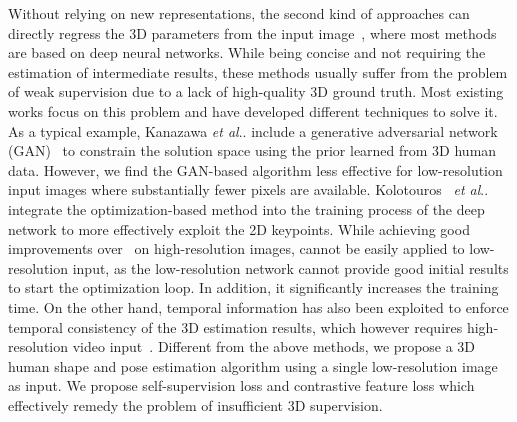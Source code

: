 \documentclass[runningheads]{llncs}
\makeatletter
\DeclareRobustCommand\onedot{\futurelet\@let@token\@onedot}
\def\@onedot{\ifx\@let@token.\else.\null\fi\xspace}
\def\etal{\emph{et al}\onedot}
\makeatother
\begin{document}
Without relying on new representations, the second kind of approaches can directly regress the 3D parameters from the input image~\cite{kanazawa2018end,kanazawa2019learning,kolotouros2019spin,saito2019pifu,kocabas2019vibe,pumarola20193dpeople,zhang2019predicting}, where most methods are based on deep neural networks.
While being concise and not requiring the estimation of intermediate results, these methods usually suffer from the problem of weak supervision due to a lack of high-quality 3D ground truth.
Most existing works focus on this problem and have developed different techniques to solve it. 
As a typical example, Kanazawa \etal \cite{kanazawa2018end} include a generative adversarial network (GAN)~\cite{gan} to constrain the solution space using the prior learned from 3D human data.  
However, we find the GAN-based algorithm less effective for low-resolution input images where substantially fewer pixels are available.
Kolotouros~\cite{kolotouros2019spin} \etal integrate the optimization-based method \cite{bogo2016keep} into the training process of the deep network to more effectively exploit the 2D keypoints. 
While achieving good improvements over~\cite{kanazawa2018end} on high-resolution images, \cite{kolotouros2019spin} cannot be easily applied to low-resolution input, as the low-resolution network cannot provide good initial results to start the optimization loop. 
In addition, it significantly increases the training time.
On the other hand, temporal information has also been exploited to enforce temporal consistency of the 3D estimation results, which however requires high-resolution video input~\cite{kanazawa2019learning,zhang2019predicting,kocabas2019vibe}.
Different from the above methods, we propose a 3D human shape and pose estimation algorithm using a single low-resolution image as input.
We propose self-supervision loss and contrastive feature loss which effectively remedy the problem of insufficient 3D supervision.
\end{document}
